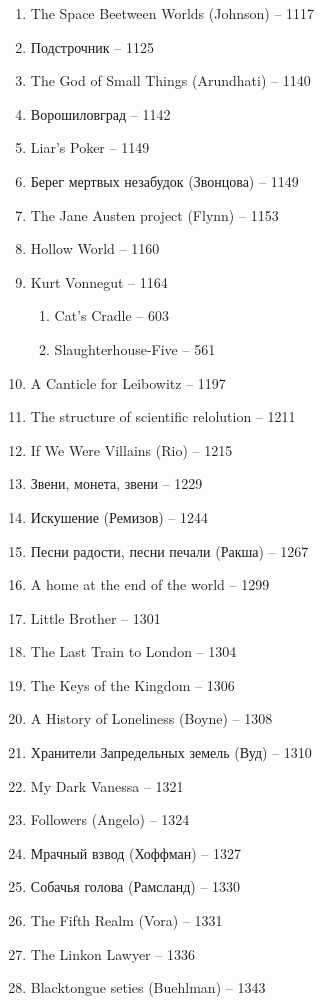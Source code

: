 \documentclass[a4paper, 11pt]{proc} %
\begin{document}
\begin{enumerate}
    \item The Space Beetween Worlds (Johnson) -- 1117
    \item Подстрочник -- 1125
    \item The God of Small Things (Arundhati) -- 1140
    \item Ворошиловград -- 1142
    \item Liar's Poker -- 1149
    \item Берег мертвых незабудок (Звонцова) -- 1149
    \item The Jane Austen project (Flynn) -- 1153
    \item Hollow World -- 1160
    \item Kurt Vonnegut -- 1164
        \begin{enumerate}
            \item Cat's Cradle -- 603
            \item Slaughterhouse-Five -- 561
        \end{enumerate}
    \item A Canticle for Leibowitz -- 1197
    \item The structure of scientific relolution -- 1211
    \item If We Were Villains (Rio) -- 1215
    \item Звени, монета, звени -- 1229
    \item Искушение (Ремизов) -- 1244
    \item Песни радости, песни печали (Ракша) -- 1267
    \item A home at the end of the world -- 1299
    \item Little Brother -- 1301
    \item The Last Train to London -- 1304
    \item The Keys of the Kingdom -- 1306
    \item A History of Loneliness (Boyne) -- 1308
    \item Хранители Запредельных земель (Вуд) -- 1310
    \item My Dark Vanessa -- 1321
    \item Followers (Angelo) -- 1324
    \item Мрачный взвод (Хоффман) -- 1327
    \item Собачья голова (Рамсланд) -- 1330
    \item The Fifth Realm (Vora) -- 1331
    \item The Linkon Lawyer -- 1336
    \item Blacktongue seties (Buehlman) -- 1343

\end{enumerate}
\end{document}

